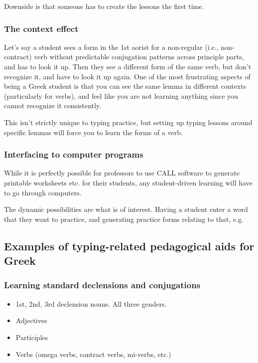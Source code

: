 \documentclass[11pt]{article}
\begin{document}
Downside is that someone has to create the lessons the first time.

\subsubsection{The context effect}
\label{sec:org8c996dd}

Let's say a student sees a form in the 1st aorist for a non-regular (i.e., non-contract) verb without predictable conjugation patterns across principle parts, and has to look it up. Then they see a different form of the same verb, but don't recognize it, and have to look it up again. One of the most frustrating aspects of being a Greek student is that you can see the same lemma in different contexts (particularly for verbs), and feel like you are not learning anything since you cannot recognize it consistently.

This isn't strictly unique to typing practice, but setting up typing lessons around specific lemmas will force you to learn the forms of a verb.

\subsubsection{Interfacing to computer programs}
\label{sec:org4070a0b}

While it is perfectly possible for professors to use CALL software to generate printable worksheets etc. for their students, any student-driven learning will have to go through computers.

The dynamic possibilities are what is of interest. Having a student enter a word that they want to practice, and generating practice forms relating to that, e.g.

\subsection{Examples of typing-related pedagogical aids for Greek}
\label{sec:org783cdf4}

\subsubsection{Learning standard declensions and conjugations}
\label{sec:org9ebcec4}

\begin{itemize}
\item 1st, 2nd, 3rd declension nouns. All three genders.
\item Adjectives
\item Participles
\item Verbs (omega verbs, contract verbs, mi-verbs, etc.)
\end{itemize}
\end{document}
